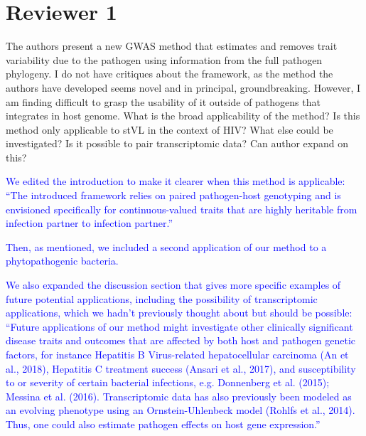\documentclass[11pt]{article}
\begin{document}
\section*{Reviewer 1}

The authors present a new GWAS method that estimates and removes trait variability due to the pathogen using information from the full pathogen phylogeny. I do not have critiques about the framework, as the method the authors have developed seems novel and in principal, groundbreaking. However, I am finding difficult to grasp the usability of it outside of pathogens that integrates in host genome. What is the broad applicability of the method? Is this method only applicable to stVL in the context of HIV? What else could be investigated? Is it possible to pair transcriptomic data? Can author expand on this?

\vspace{5mm}
\textcolor{blue}{We edited the introduction to make it clearer when this method is applicable: ``The introduced framework relies on paired pathogen-host genotyping and is envisioned specifically for continuous-valued traits that are highly heritable from infection partner to infection partner.''}

\textcolor{blue}{Then, as mentioned, we included a second application of our method to a phytopathogenic bacteria.}

\textcolor{blue}{We also expanded the discussion section that gives more specific examples of future potential applications, including the possibility of transcriptomic applications, which we hadn't previously thought about but should be possible: ``Future applications of our method might investigate other clinically significant disease traits and outcomes that are affected by both host and pathogen genetic factors, for instance Hepatitis B Virus-related hepatocellular carcinoma (An et al., 2018), Hepatitis C treatment success (Ansari et al., 2017), and susceptibility to or severity of certain bacterial infections, e.g. Donnenberg et al. (2015); Messina et al. (2016). Transcriptomic data has also previously been modeled as an evolving phenotype using an Ornstein-Uhlenbeck model (Rohlfs et al., 2014). Thus, one could also estimate pathogen effects on host gene expression.''}
\end{document}
